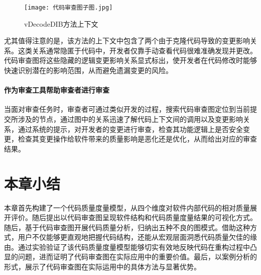 \begin{figure}[h]
\centering
\texttt{[image: 代码审查图子图.jpg]}
\caption{vDecodeDIB方法上下文}
\end{figure}

尤其值得注意的是，该方法的上下文中包含了两个由于克隆代码导致的变更影响关系。这类关系通常隐匿于代码中，开发者仅靠手动查看代码很难准确发现并更改。代码审查图将这些隐藏的逻辑变更影响关系显式标出，使开发者在代码修改时能够快速识别潜在的影响范围，从而避免遗漏变更的风险。

\paragraph{作为审查工具帮助审查者进行审查} 当面对审查任务时，审查者可通过类似开发的过程，搜索代码审查图定位到当前提交所涉及的节点，通过图中的关系迅速了解代码上下文间的调用以及变更影响关系，通过系统的提示，对开发者的变更进行审查，检查其功能逻辑上是否安全变更，检查其变更操作给软件带来的质量影响是恶化还是优化，从而给出对应的审查结果。

\section{本章小结}

本章首先构建了一个代码质量度量模型，从四个维度对软件内部代码的相对质量展开评价。随后提出以代码审查图呈现软件结构和代码质量度量结果的可视化方式。随后，基于代码审查图开展代码质量分析，归纳出五种不良的图模式。借助这种方式，用户不仅能够更直观地把握代码结构，还能从宏观层面洞悉代码质量欠佳的缘由。通过实验验证了该代码质量度量模型能够切实有效地反映代码在重构过程中凸显的问题，进而证明了代码审查图在实际应用中的重要价值。最后，以案例分析的形式，展示了代码审查图在实际运用中的具体方法与显著优势。 
